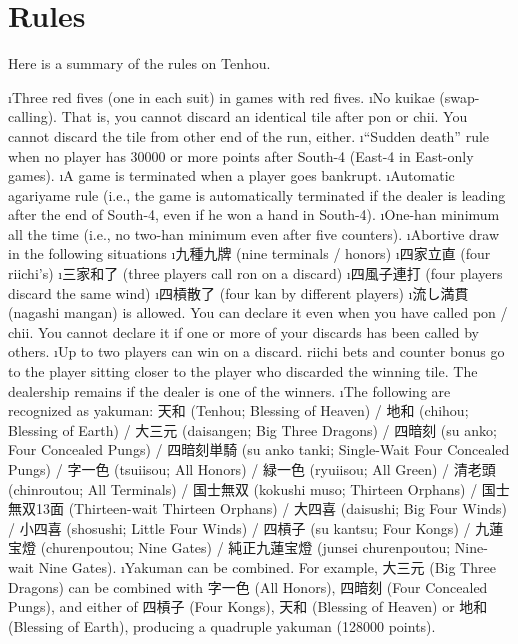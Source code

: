 \section{Rules}
Here is a summary of the rules on {\jap Tenhou}. 

\bi
\i Three red fives (one in each suit) in games with red fives.
\i No {\jap kuikae} (swap-calling). That is, you cannot discard an identical tile after {\jap pon} or {\jap chii}. You cannot discard the tile from other end of the run, either. 
\i ``Sudden death'' rule when no player has 30000 or more points after South-4 (East-4 in East-only games).
\i A game is terminated when a player goes bankrupt.
\i Automatic {\jap agariyame} rule (i.e., the game is automatically terminated if the dealer is leading after the end of South-4, even if he won a hand in South-4).
\i One-{\jap han} minimum all the time (i.e., no two-{\jap han} minimum even after five counters).
\i Abortive draw in the following situations
	\bi
	\i 九種九牌 (nine terminals / honors)
	\i 四家立直 (four riichi's)
	\i 三家和了 (three players call {\jap ron} on a discard)
	\i 四風子連打 (four players discard the same wind)
	\i 四槓散了 (four {\jap kan} by different players)
	\ei
\i 流し満貫 ({\jap nagashi mangan}) is allowed. You can declare it even when you have called {\jap pon} / {\jap chii}. You cannot declare it if one or more of your discards has been called by others.
\i Up to two players can win on a discard. riichi bets and counter bonus go to the player sitting closer to the player who discarded the winning tile. The dealership remains if the dealer is one of the winners.
\i The following are recognized as {\jap yakuman}: 
天和 ({\jap Tenhou}; Blessing of Heaven) / 地和 ({\jap chihou}; Blessing of Earth) / 大三元 ({\jap daisangen}; Big Three Dragons) / 四暗刻 ({\jap su anko}; Four Concealed Pungs) / 四暗刻単騎 ({\jap su anko tanki}; Single-Wait Four Concealed Pungs) / 字一色 ({\jap tsuiisou}; All Honors) / 緑一色 ({\jap ryuiisou}; All Green) / 清老頭 ({\jap chinroutou}; All Terminals) / 国士無双 ({\jap kokushi muso}; Thirteen Orphans) / 国士無双13面 (Thirteen-wait Thirteen Orphans) / 大四喜 ({\jap daisushi}; Big Four Winds) / 小四喜 ({\jap shosushi}; Little Four Winds) / 四槓子 ({\jap su kantsu}; Four Kongs) / 九蓮宝燈 ({\jap churenpoutou}; Nine Gates) / 純正九蓮宝燈 ({\jap junsei churenpoutou}; Nine-wait Nine Gates).
\i {\jap Yakuman} can be combined. For example, 大三元 (Big Three Dragons) can be combined with 字一色 (All Honors), 四暗刻 (Four Concealed Pungs), and either of 四槓子 (Four Kongs), 天和 (Blessing of Heaven) or 地和 (Blessing of Earth), producing a quadruple {\jap yakuman} (128000 points). 
